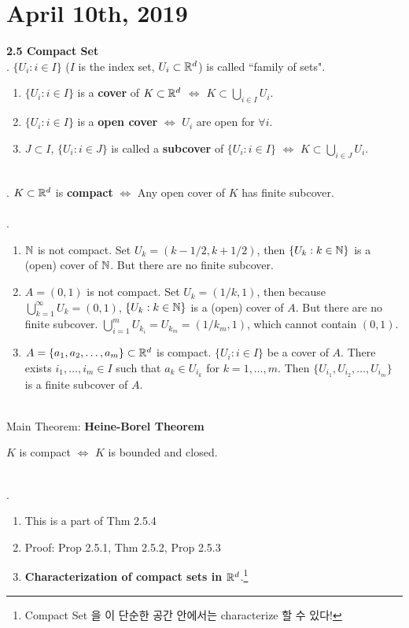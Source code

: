 \section*{April 10th, 2019}
\textbf{2.5 Compact Set}\\
. $\{U_i: i\in I\}$ ($ I $ is the index set, $U_i\subset \mathbb{R}^d$) is called ``family of sets".
\begin{enumerate}
	\item $ \{U_i: i\in I\} $ is a \textbf{cover} of $K\subset \mathbb{R}^d$ $\iff$ $K\subset \bigcup_{i\in I}U_i$.
	\item $\{U_i: i\in I\}$ is a \textbf{open cover} $\iff$ $U_i$ are open for $\forall i$.
	\item $J\subset I$, $\{U_i: i\in J\}$ is called a \textbf{subcover} of $\{U_i: i\in I\}$ $\iff$ $ K \subset \bigcup_{i\in J} U_i$.
\end{enumerate}~\\
. $K\subset \mathbb{R}^d$ is \textbf{compact} $\iff$ Any open cover of $K$ has finite subcover.\\
\\
\ex.
\begin{enumerate}
	\item $\mathbb{N}$ is not compact. Set $U_k = (k - 1/2, k+1/2)$, then $\{U_k:k\in \mathbb{N} \}$ is a (open) cover of $\mathbb{N}$. But there are no finite subcover.
	\item $ A=(0, 1) $ is not compact. Set $U_k = (1/k, 1)$, then because $\bigcup_{k=1}^\infty U_k = (0, 1)$, $\{U_k: k\in\mathbb{N} \}$ is a (open) cover of $A$. But there are no finite subcover. $\bigcup_{i=1}^{m} U_{k_i} = U_{k_m} = (1/k_m, 1)$, which cannot contain $(0, 1)$.
	\item $A = \{a_1, a_2, \dots, a_m \}\subset \mathbb{R}^d$ is compact. $ \{U_i: i\in I\} $ be a cover of $A$. There exists $i_1, \dots, i_m\in I$ such that $a_k \in U_{i_k}$ for $k = 1, \dots, m$. Then $\{U_{i_1}, U_{i_2}, \dots, U_{i_m} \}$ is a finite subcover of $A$.
\end{enumerate}~\\
Main Theorem: \textbf{Heine-Borel Theorem}
\begin{center}
	$K$ is compact $\iff$ $K$ is bounded and closed.	
\end{center}~\\
\rmk.
\begin{enumerate}
	\item This is a part of Thm 2.5.4
	\item Proof: Prop 2.5.1, Thm 2.5.2, Prop 2.5.3
	\item \textbf{Characterization of compact sets in $\mathbb{R}^d$}.\footnote{Compact Set 을 이 단순한 공간 안에서는 characterize 할 수 있다!}
\end{enumerate}
